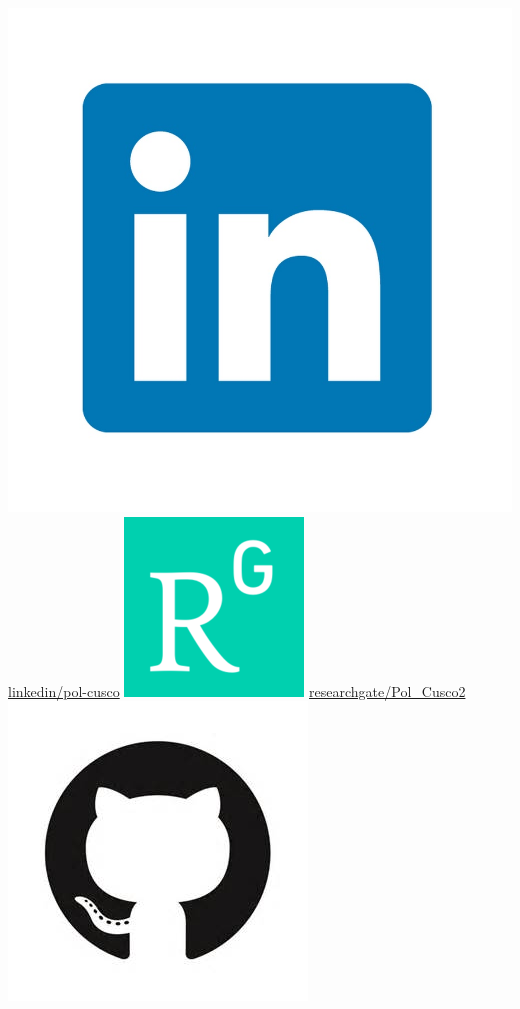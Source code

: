 \documentclass[]{friggeri-cv} %
\begin{document}
\begin{aside}
  \includegraphics[scale=0.02]{linkedinlogo.jpeg}
  \href{http://www.linkedin.com/in/pol-cuscó-80246963}{linkedin/pol-cusco}
  \includegraphics[scale=0.07]{researchgatelogo.png}
  \href{https://www.researchgate.net/profile/Pol\_Cusco2}{researchgate/Pol\_Cusco2}
  \includegraphics[scale=0.08]{githublogo.jpeg}

\end{aside}
\end{document}
